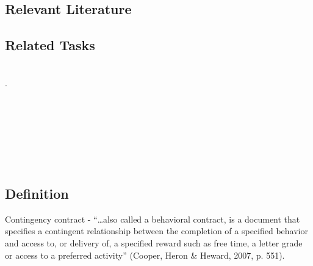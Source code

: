\subsection{Relevant Literature}
\begin{refsection}
\nocite{test,alang2017police,clayton2018black}
\printbibliography[heading=none]
\end{refsection}
%
\subsection{Related Tasks}
\fourdOne{}\\.
\fourdSixteen{}\\
\fourkTwo{}\\
\fourFKThirty{}\\
\fourFKThirtyOne{}\\
\fourFKThirtyThree{}\\
\fourFKFourtyOne{}\\
\fourFKFourtyTwo{}\\
%
%
%
%
%
%
%
%
%
\section[\foureFour{}]{\foureFour{}%
              }
\subsection{Definition}
Contingency contract -  ``…also called a behavioral contract, is a document that specifies a contingent relationship between the completion of a specified behavior and access to, or delivery of, a specified reward such as free time, a letter grade or access to a preferred activity'' (Cooper, Heron \& Heward, 2007, p. 551). 

